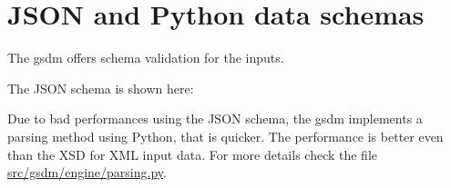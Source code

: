 \chapter{JSON and Python data schemas}\label{ap:json_schema}

The \acrshort{gsdm} offers schema validation for the inputs. 

The JSON schema is shown here:



Due to bad performances using the JSON schema, the \acrshort{gsdm} implements a parsing method using Python, that is quicker. The performance is better even than the XSD for XML input data. For more details check the file \href{https://bitbucket.org/dbrosnan/gsdm/src/master/src/gsdm/engine/parsing.py}{src/gsdm/engine/parsing.py}.
